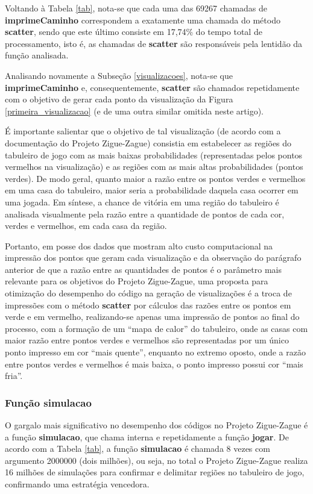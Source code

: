 \documentclass[12pt]{article}
\newcommand{\aspas}[1]{``#1''} %
\begin{document}
Voltando à Tabela \ref{tab}, nota-se que cada uma das 69267 chamadas de \textbf{imprimeCaminho} correspondem a exatamente uma chamada do método \textbf{scatter}, sendo que este último consiste em 17,74\% do tempo total de processamento, isto é, as chamadas de \textbf{scatter} são responsáveis pela lentidão da função analisada.

Analisando novamente a Subseção \ref{visualizacoes}, nota-se que \textbf{imprimeCaminho} e, consequentemente, \textbf{scatter} são chamados repetidamente com o objetivo de gerar cada ponto da visualização da Figura \ref{primeira_visualizacao} (e de uma outra similar omitida neste artigo). 

É importante salientar que o objetivo de tal visualização (de acordo com a documentação do Projeto Zigue-Zague) consistia em estabelecer as regiões do tabuleiro de jogo com as mais baixas probabilidades (representadas pelos pontos vermelhos na visualização) e as regiões com as mais altas probabilidades (pontos verdes). De modo geral, quanto maior a razão entre os pontos verdes e vermelhos em uma casa do tabuleiro, maior seria a probabilidade daquela casa ocorrer em uma jogada. Em síntese, a chance de vitória em uma região do tabuleiro é analisada visualmente pela razão entre a quantidade de pontos de cada cor, verdes e vermelhos, em cada casa da região.

Portanto, em posse dos dados que mostram alto custo computacional na impressão dos pontos que geram cada visualização e da observação do parágrafo anterior de que a razão entre as quantidades de pontos é o parâmetro mais relevante para os objetivos do Projeto Zigue-Zague, uma proposta para otimização do desempenho do código na geração de visualizações é a troca de impressões com o método \textbf{scatter} por cálculos das razões entre os pontos em verde e em vermelho, realizando-se apenas uma impressão de pontos ao final do processo, com a formação de um \aspas{mapa de calor} do tabuleiro, onde as casas com maior razão entre pontos verdes e vermelhos são representadas por um único ponto impresso em cor \aspas{mais quente}, enquanto no extremo oposto, onde a razão entre pontos verdes e vermelhos é mais baixa, o ponto impresso possui cor \aspas{mais fria}.

\subsubsection{Função simulacao}
\label{simulacao}

O gargalo mais significativo no desempenho dos códigos no Projeto Zigue-Zague é a função \textbf{simulacao}, que chama interna e repetidamente a função \textbf{jogar}. De acordo com a Tabela \ref{tab}, a função \textbf{simulacao} é chamada 8 vezes com argumento 2000000 (dois milhões), ou seja, no total o Projeto Zigue-Zague realiza 16 milhões de simulações para confirmar e delimitar regiões no tabuleiro de jogo, confirmando uma estratégia vencedora.
\end{document}
